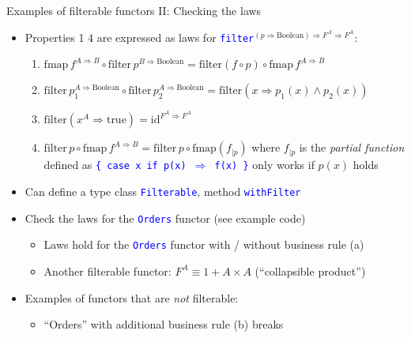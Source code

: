 \documentclass[english]{beamer}
\begin{document}
\begin{frame}{Examples of filterable functors II: Checking the laws}

\begin{itemize}
\item Properties 1 \textendash{} 4 are expressed as laws for \texttt{\textcolor{blue}{\footnotesize{}filter}}$^{(p\Rightarrow\text{Boolean})\Rightarrow F^{A}\Rightarrow F^{A}}$:
\begin{enumerate}
\item {\footnotesize{}$\text{fmap}\,f^{A\Rightarrow B}\circ\text{filter}\,p^{B\Rightarrow\text{Boolean}}=\text{filter}\left(f\circ p\right)\circ\text{fmap}\,f^{A\Rightarrow B}$}{\footnotesize \par}
\item {\footnotesize{}$\text{filter}\,p_{1}^{A\Rightarrow\text{Boolean}}\circ\text{filter}\,p_{2}^{A\Rightarrow\text{Boolean}}=\text{filter}\left(x\Rightarrow p_{1}(x)\wedge p_{2}(x)\right)$}{\footnotesize \par}
\item {\footnotesize{}$\text{filter}\left(x^{A}\Rightarrow\text{true}\right)=\text{id}^{F^{A}\Rightarrow F^{A}}$ }{\footnotesize \par}
\item {\footnotesize{}$\text{filter}\,p\circ\text{fmap}\,f^{A\Rightarrow B}=\text{filter}\,p\circ\text{fmap}\left(f_{|p}\right)$
}where {\footnotesize{}$f_{|p}$} is the \emph{partial function} defined
as \texttt{\textcolor{blue}{\footnotesize{}\{ case x if p(x) $\Rightarrow$
f(x) \}}} \textendash{} only works if $p(x)$ holds
\end{enumerate}
\item Can define a type class \texttt{\textcolor{blue}{\footnotesize{}Filterable}},
method \texttt{\textcolor{blue}{\footnotesize{}withFilter}} 
\item Check the laws for the \texttt{\textcolor{blue}{\footnotesize{}Orders}}
functor (see example code)
\begin{itemize}
\item Laws hold for the \texttt{\textcolor{blue}{\footnotesize{}Orders}}
functor with / without business rule (a)
\item Another filterable functor: $F^{A}\equiv1+A\times A$ (``collapsible
product'')
\end{itemize}
\item Examples of functors that are \emph{not} filterable:
\begin{itemize}
\item ``Orders'' with additional business rule (b) \textendash{} breaks

\end{itemize}
\end{itemize}
\end{frame}
\end{document}
